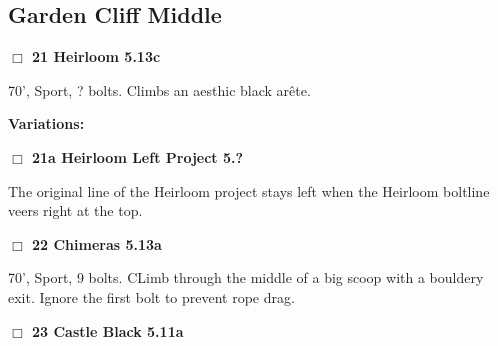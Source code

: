 	\begin{multicols}{2}



\needspace{10em}
\subsection*{Garden Cliff Middle}\label{bf:Garden Cliff Middle}




\needspace{2em}
\label{rt:Heirloom}
\colorbox{Goldenrod!20}{
\parbox{0.95\linewidth}{
\hspace{-1ex}\textbf{$\Box$
21 Heirloom 5.13c  
}}}
\begin{adjustwidth}{1.3em}{}			

70', Sport, ? bolts. Climbs an aesthic black arête.
\end{adjustwidth}


\begin{adjustwidth}{0.5cm}{}				
\needspace{4em}
\textbf{Variations:} \newline

\needspace{2em}
\label{vr:Heirloom Left Project}
\colorbox{black!20}{
\parbox{0.95\linewidth}{
\hspace{-1ex}\textbf{$\Box$
21a Heirloom Left Project 5.?  
}}}
\begin{adjustwidth}{1.3em}{}			

The original line of the Heirloom project stays left when the Heirloom boltline veers right at the top.
\end{adjustwidth}



\end{adjustwidth}


\needspace{2em}
\label{rt:Chimeras}
\colorbox{Goldenrod!20}{
\parbox{0.95\linewidth}{
\hspace{-1ex}\textbf{$\Box$
22 Chimeras 5.13a  
}}}
\begin{adjustwidth}{1.3em}{}			

70', Sport, 9 bolts. CLimb through the middle of a big scoop with a bouldery exit. Ignore the first bolt to prevent rope drag.
\end{adjustwidth}




\needspace{2em}
\label{rt:Castle Black}
\colorbox{RoyalBlue!20}{
\parbox{0.95\linewidth}{
\hspace{-1ex}\textbf{$\Box$
23 Castle Black 5.11a  
}}}
\begin{adjustwidth}{1.3em}{}			


\end{adjustwidth}
\end{multicols}
